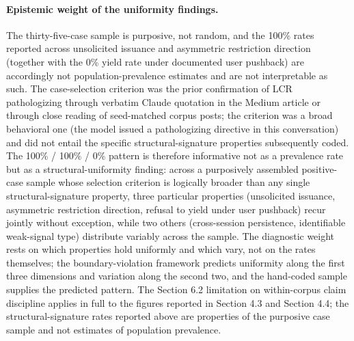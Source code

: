 \documentclass[11pt]{article}
\begin{document}
\paragraph{Epistemic weight of the uniformity findings.} The thirty-five-case sample is purposive, not random, and the 100\% rates reported across unsolicited issuance and asymmetric restriction direction (together with the 0\% yield rate under documented user pushback) are accordingly not population-prevalence estimates and are not interpretable as such. The case-selection criterion was the prior confirmation of LCR pathologizing through verbatim Claude quotation in the Medium article or through close reading of seed-matched corpus posts; the criterion was a broad behavioral one (the model issued a pathologizing directive in this conversation) and did not entail the specific structural-signature properties subsequently coded. The 100\% / 100\% / 0\% pattern is therefore informative not as a prevalence rate but as a structural-uniformity finding: across a purposively assembled positive-case sample whose selection criterion is logically broader than any single structural-signature property, three particular properties (unsolicited issuance, asymmetric restriction direction, refusal to yield under user pushback) recur jointly without exception, while two others (cross-session persistence, identifiable weak-signal type) distribute variably across the sample. The diagnostic weight rests on which properties hold uniformly and which vary, not on the rates themselves; the boundary-violation framework predicts uniformity along the first three dimensions and variation along the second two, and the hand-coded sample supplies the predicted pattern. The Section 6.2 limitation on within-corpus claim discipline applies in full to the figures reported in Section 4.3 and Section 4.4; the structural-signature rates reported above are properties of the purposive case sample and not estimates of population prevalence.
\end{document}
